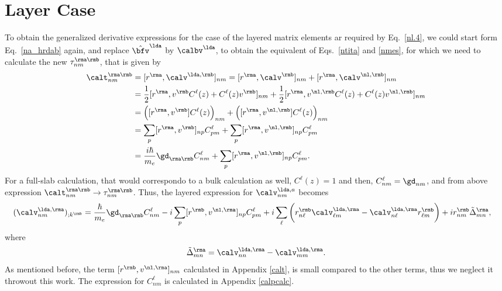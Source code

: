 \section{Layer Case}

To obtain the generalized derivative expressions for the case of the
layered matrix elements ar required by Eq.~\eqref{nl.4}, we could
start form Eq.~\eqref{na_hrdab} again, and replace $\hat\bfv^\lda$
by $\calbv^\lda$, to obtain the equivalent of Eqs.~\eqref{ntita} and
\eqref{nmes}, for which we need to calculate the new
$\tau^{\rma\rmb}_{nm}$, that is given by
\begin{align}\label{na_hrdab-n}
\calt^{\rma\rmb}_{nm}&=
[r^{\rma},\calv^{\lda,\rmb}]_{nm}
= 
[r^{\rma},\calv^\rmb]_{nm}+
[r^{\rma},\calv^{\nl,\rmb}]_{nm}
\nonumber\\
&=
\frac{1}{2}
[r^{\rma},v^\rmb C^\ell(z)+C^\ell(z) v^\rmb]_{nm} 
+
\frac{1}{2}
[r^{\rma},v^{\nl,\rmb} C^\ell(z)+C^\ell(z) v^{\nl,\rmb}]_{nm} 
\nonumber\\
&=
\Big([r^{\rma},v^\rmb]C^\ell(z)\Big)_{nm} 
+
\Big(
[r^{\rma},v^{\nl,\rmb}] C^\ell(z)\Big)_{nm} 
\nonumber\\
&=
\sum_p[r^{\rma},v^\rmb]_{np}C^\ell_{pm} 
+
\sum_p 
[r^{\rma},v^{\nl,\rmb}]_{np}C^\ell_{pm} 
\nonumber\\
&=
\frac{i\hbar}{m_e}\gd_{\rma\rmb} C^\ell_{nm} 
+
\sum_p 
[r^{\rma},v^{\nl,\rmb}]_{np}C^\ell_{pm} 
.
\end{align} 
For a full-slab calculation, that would correspondo to a bulk
calculation as well, $C^\ell(z)=1$ and then, $C^\ell_{nm}=\gd_{nm}$,
and from above expression 
$\calt^{\rma\rmb}_{nm}\to \tau^{\rma\rmb}_{nm}$.
Thus, the layered expression for $\calv^{\lda,a}_{nm}$ becomes
\begin{align}\label{nmesn}
(\calv^{\lda,\rma}_{nm})_{;k^{\rmb}}&=
\frac{\hbar}{m_e}\gd_{\rma\rmb}
C^\ell_{nm} 
-i
\sum_p 
[r^{\rmb},v^{\nl,\rma}]_{np}C^\ell_{pm} 
+i
\sum_{\ell}
\bigg(
r^{\rmb}_{n\ell}  
\calv^{\lda,\rma}_{\ell m}
-
\calv^{\lda,\rma}_{n\ell}   
r^{\rmb}_{\ell m}
\bigg)  
+i  
r^{\rmb}_{nm}
\tilde\Delta^{\rma}_{mn}
,
\end{align}  
where
\begin{eqnarray}\label{tdel}
\tilde\Delta^{\rma}_{mn}
=
\calv^{\lda,\rma}_{nn}  
-
\calv^{\lda,\rma}_{mm}  
.
\end{eqnarray}
As mentioned before, the term $[r^{\rmb},v^{\nl,\rma}]_{nm}$
calculated in Appendix \ref{calt}, is small
compared to the other terms, thus we neglect it throwout this work.\cite{valerie} 
The expression for $C^\ell_{nm}$ is calculated in Appendix \ref{calpcalc}.
